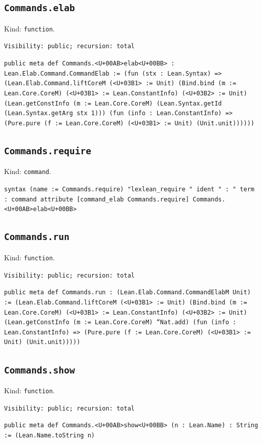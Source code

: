 \documentclass[11pt]{article}
\begin{document}
\subsection*{\texttt{Commands.elab}}
\noindent Kind: \texttt{function}.\par
\noindent \texttt{Visibility: public; recursion: total}\par
\noindent \texttt{public meta def Commands.<U+00AB>elab<U+00BB> : Lean.Elab.Command.CommandElab :=   (fun (stx : Lean.Syntax) => (Lean.Elab.Command.liftCoreM (<U+03B1> := Unit) (Bind.bind (m := Lean.Core.CoreM) (<U+03B1> := Lean.ConstantInfo) (<U+03B2> := Unit) (Lean.getConstInfo (m := Lean.Core.CoreM) (Lean.Syntax.getId (Lean.Syntax.getArg stx 1))) (fun (info : Lean.ConstantInfo) => (Pure.pure (f := Lean.Core.CoreM) (<U+03B1> := Unit) (Unit.unit))))))}\par
\subsection*{\texttt{Commands.require}}
\noindent Kind: \texttt{command}.\par
\noindent \texttt{syntax (name := Commands.require) "lexlean\_require " ident " : " term : command attribute [command\_elab Commands.require] Commands.<U+00AB>elab<U+00BB>}\par
\subsection*{\texttt{Commands.run}}
\noindent Kind: \texttt{function}.\par
\noindent \texttt{Visibility: public; recursion: total}\par
\noindent \texttt{public meta def Commands.run : (Lean.Elab.Command.CommandElabM Unit) :=   (Lean.Elab.Command.liftCoreM (<U+03B1> := Unit) (Bind.bind (m := Lean.Core.CoreM) (<U+03B1> := Lean.ConstantInfo) (<U+03B2> := Unit) (Lean.getConstInfo (m := Lean.Core.CoreM) ``Nat.add) (fun (info : Lean.ConstantInfo) => (Pure.pure (f := Lean.Core.CoreM) (<U+03B1> := Unit) (Unit.unit)))))}\par
\subsection*{\texttt{Commands.show}}
\noindent Kind: \texttt{function}.\par
\noindent \texttt{Visibility: public; recursion: total}\par
\noindent \texttt{public meta def Commands.<U+00AB>show<U+00BB> (n : Lean.Name) : String :=   (Lean.Name.toString n)}\par
\end{document}
